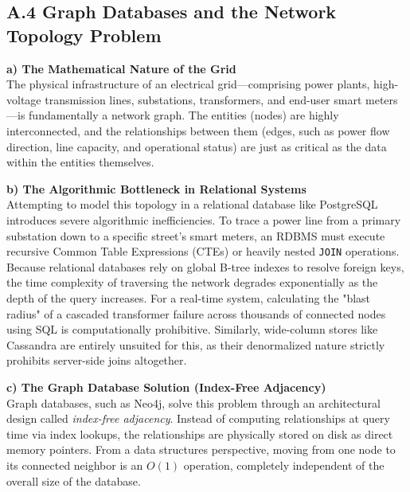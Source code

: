 \documentclass[11pt, a4paper]{article}
\makeatletter
\renewcommand{\_}{\origunderscore\penalty\z@\hskip\z@skip}
\renewcommand{\{}{\origlbrace\penalty\z@\hskip\z@skip}
\renewcommand{\}}{\origrbrace\penalty\z@\hskip\z@skip}
\makeatother
\begin{document}
\subsection*{A.4 Graph Databases and the Network Topology Problem}

\textbf{a) The Mathematical Nature of the Grid} \\
The physical infrastructure of an electrical grid---comprising power plants, high-voltage transmission lines, substations, transformers, and end-user smart meters---is fundamentally a network graph. The entities (nodes) are highly interconnected, and the relationships between them (edges, such as power flow direction, line capacity, and operational status) are just as critical as the data within the entities themselves.

\textbf{b) The Algorithmic Bottleneck in Relational Systems} \\
Attempting to model this topology in a relational database like PostgreSQL introduces severe algorithmic inefficiencies. To trace a power line from a primary substation down to a specific street's smart meters, an RDBMS must execute recursive Common Table Expressions (CTEs) or heavily nested \texttt{JOIN} operations. Because relational databases rely on global B-tree indexes to resolve foreign keys, the time complexity of traversing the network degrades exponentially as the depth of the query increases. For a real-time system, calculating the "blast radius" of a cascaded transformer failure across thousands of connected nodes using SQL is computationally prohibitive. Similarly, wide-column stores like Cassandra are entirely unsuited for this, as their denormalized nature strictly prohibits server-side joins altogether.

\textbf{c) The Graph Database Solution (Index-Free Adjacency)} \\
Graph databases, such as Neo4j, solve this problem through an architectural design called \textit{index-free adjacency}. Instead of computing relationships at query time via index lookups, the relationships are physically stored on disk as direct memory pointers. From a data structures perspective, moving from one node to its connected neighbor is an $O(1)$ operation, completely independent of the overall size of the database. 
\end{document}
